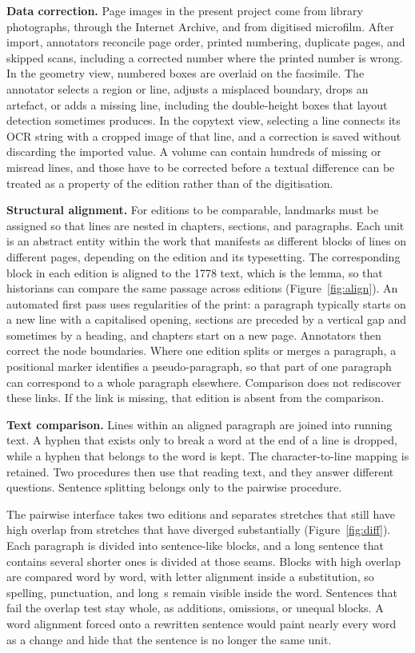 \documentclass[sigconf,natbib,anonymous]{acmart}
\begin{document}
\textbf{Data correction.}
Page images in the present project come from library photographs, through the Internet Archive, and from digitised microfilm.
After import, annotators reconcile page order, printed numbering, duplicate pages, and skipped scans, including a corrected number where the printed number is wrong.
In the geometry view, numbered boxes are overlaid on the facsimile.
The annotator selects a region or line, adjusts a misplaced boundary, drops an artefact, or adds a missing line, including the double-height boxes that layout detection sometimes produces.
In the copytext view, selecting a line connects its OCR string with a cropped image of that line, and a correction is saved without discarding the imported value.
A volume can contain hundreds of missing or misread lines, and those have to be corrected before a textual difference can be treated as a property of the edition rather than of the digitisation.

\textbf{Structural alignment.}
For editions to be comparable, landmarks must be assigned so that lines are nested in chapters, sections, and paragraphs.
Each unit is an abstract entity within the work that manifests as different blocks of lines on different pages, depending on the edition and its typesetting.
The corresponding block in each edition is aligned to the 1778 text, which is the lemma, so that historians can compare the same passage across editions (Figure~\ref{fig:align}).
An automated first pass uses regularities of the print: a paragraph typically starts on a new line with a capitalised opening, sections are preceded by a vertical gap and sometimes by a heading, and chapters start on a new page.
Annotators then correct the node boundaries.
Where one edition splits or merges a paragraph, a positional marker identifies a pseudo-paragraph, so that part of one paragraph can correspond to a whole paragraph elsewhere.
Comparison does not rediscover these links.
If the link is missing, that edition is absent from the comparison.

\textbf{Text comparison.}
Lines within an aligned paragraph are joined into running text.
A hyphen that exists only to break a word at the end of a line is dropped, while a hyphen that belongs to the word is kept.
The character-to-line mapping is retained.
Two procedures then use that reading text, and they answer different questions.
Sentence splitting belongs only to the pairwise procedure.

The pairwise interface takes two editions and separates stretches that still have high overlap from stretches that have diverged substantially (Figure~\ref{fig:diff}).
Each paragraph is divided into sentence-like blocks, and a long sentence that contains several shorter ones is divided at those seams.
Blocks with high overlap are compared word by word, with letter alignment inside a substitution, so spelling, punctuation, and long~s remain visible inside the word.
Sentences that fail the overlap test stay whole, as additions, omissions, or unequal blocks.
A word alignment forced onto a rewritten sentence would paint nearly every word as a change and hide that the sentence is no longer the same unit.
\end{document}
